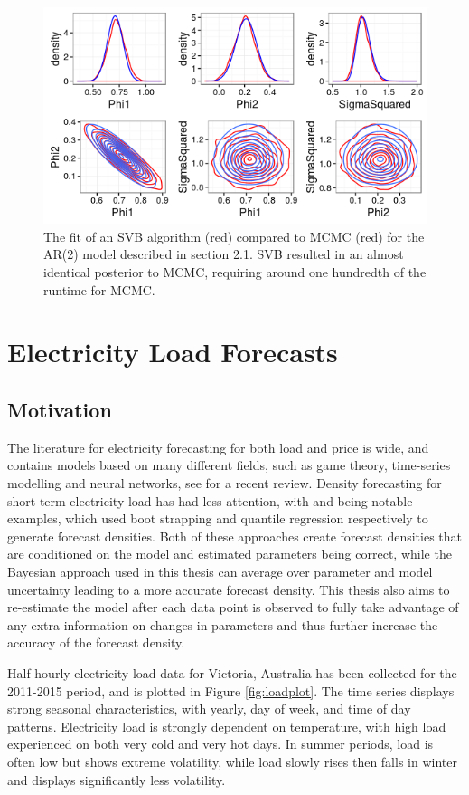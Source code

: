 \documentclass[12pt,a4paper]{article}%
\numberwithin{equation}{section}
\begin{document}
\begin{figure}[h]
\centering
\includegraphics[width=0.7\linewidth,height=\textheight,keepaspectratio]{VBfit.png}
\caption{The fit of an SVB algorithm (red) compared to MCMC (red) for the AR(2) model described in section 2.1. SVB resulted in an almost identical posterior to MCMC, requiring around one hundredth of the runtime for MCMC.}
\label{fig:VBfit}
\end{figure}

\section{Electricity Load Forecasts} \label{sec:ElecLoad}
\subsection{Motivation}

The literature for electricity forecasting for both load and price is wide, and contains models based on many different fields, such as game theory, time-series modelling and neural networks, see \citet{Weron2014} for a recent review. Density forecasting for short term electricity load has had less attention, with \citet{Fan2012} and \citet{He2016} being notable examples, which used boot strapping and quantile regression respectively to generate forecast densities. Both of these approaches create forecast densities that are conditioned on the model and estimated parameters being correct, while the Bayesian approach used in this thesis can average over parameter and model uncertainty leading to a more accurate forecast density. This thesis also aims to re-estimate the model after each data point is observed to fully take advantage of any extra information on changes in parameters and thus further increase the accuracy of the forecast density. 

Half hourly electricity load data for Victoria, Australia has been collected for the 2011-2015 period, and is plotted in Figure \ref{fig:loadplot}. The time series displays strong seasonal characteristics, with yearly, day of week, and time of day patterns. Electricity load is strongly dependent on temperature, with high load experienced on both very cold and very hot days. In summer periods, load is often low but shows extreme volatility, while load slowly rises then falls in winter and displays significantly less volatility. 
\end{document}

